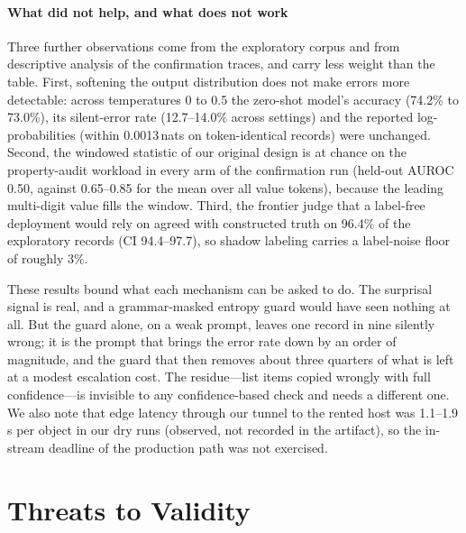\documentclass[conference]{IEEEtran}
\begin{document}
\paragraph{What did not help, and what does not work} Three further observations come from the exploratory corpus and from descriptive analysis of the confirmation traces, and carry less weight than the table. First, softening the output distribution does not make errors more detectable: across temperatures 0 to 0.5 the zero-shot model's accuracy (74.2\% to 73.0\%), its silent-error rate (12.7--14.0\% across settings) and the reported log-probabilities (within 0.0013\,nats on token-identical records) were unchanged. Second, the windowed statistic of our original design is at chance on the property-audit workload in every arm of the confirmation run (held-out AUROC 0.50, against 0.65--0.85 for the mean over all value tokens), because the leading multi-digit value fills the window. Third, the frontier judge that a label-free deployment would rely on agreed with constructed truth on 96.4\% of the exploratory records (CI 94.4--97.7), so shadow labeling carries a label-noise floor of roughly 3\%.

These results bound what each mechanism can be asked to do. The surprisal signal is real, and a grammar-masked entropy guard would have seen nothing at all. But the guard alone, on a weak prompt, leaves one record in nine silently wrong; it is the prompt that brings the error rate down by an order of magnitude, and the guard that then removes about three quarters of what is left at a modest escalation cost. The residue---list items copied wrongly with full confidence---is invisible to any confidence-based check and needs a different one. We also note that edge latency through our tunnel to the rented host was 1.1--1.9\,s per object in our dry runs (observed, not recorded in the artifact), so the in-stream deadline of the production path was not exercised.

\section{Threats to Validity}
\label{sec:threats}
\end{document}
